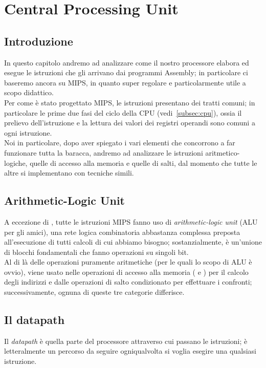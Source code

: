 \documentclass[class=book, crop=false, oneside]{standalone}
\begin{document}
\chapter{Central Processing Unit}

\section{Introduzione}
In questo capitolo andremo ad analizzare come il nostro processore elabora ed esegue le istruzioni che gli arrivano dai programmi Assembly; in particolare ci baseremo ancora su MIPS, in quanto super regolare e particolarmente utile a scopo didattico.\\
Per come è stato progettato MIPS, le istruzioni presentano dei tratti comuni; in particolare le prime due fasi del ciclo della CPU (vedi~\ref{subsec:cpu}), ossia il prelievo dell'istruzione e la lettura dei valori dei registri operandi sono comuni a ogni istruzione.\\
Noi in particolare, dopo aver spiegato i vari elementi che concorrono a far funzionare tutta la baracca, andremo ad analizzare le istruzioni aritmetico-logiche, quelle di accesso alla memoria e quelle di salti, dal momento che tutte le altre si implementano con tecniche simili.

\section{Arithmetic-Logic Unit}
A eccezione di , tutte le istruzioni MIPS fanno uso di \emph{arithmetic-logic unit} (ALU per gli amici), una rete logica combinatoria abbastanza complessa preposta all'esecuzione di tutti calcoli di cui abbiamo bisogno; sostanzialmente, è un’unione di blocchi fondamentali che fanno operazioni su singoli bit.\\
Al di là delle operazioni puramente aritmetiche (per le quali lo scopo di ALU è ovvio), viene usato nelle operazioni di accesso alla memoria ( e ) per il calcolo degli indirizzi e dalle operazioni di salto condizionato per effettuare i confronti; successivamente, ognuna di queste tre categorie differisce.

\section{Il datapath}
Il \emph{datapath} è quella parte del processore attraverso cui passano le istruzioni; è letteralmente un percorso da seguire ogniqualvolta si voglia esegire una qualsiasi istruzione.
\end{document}
